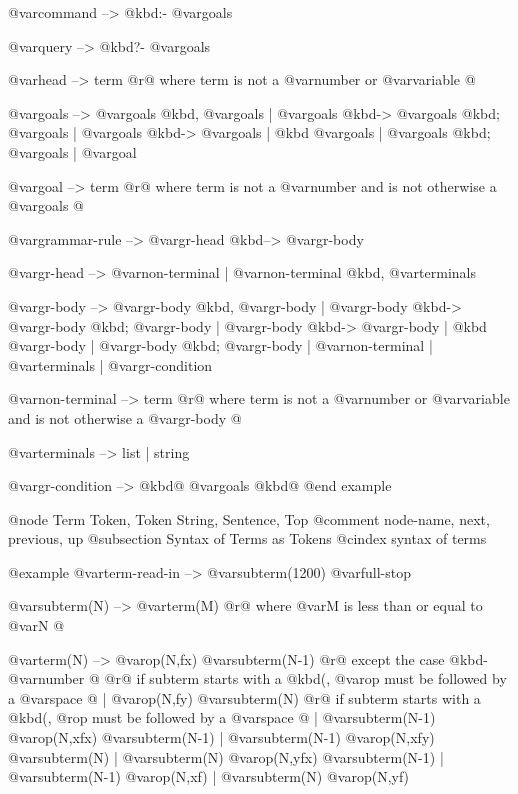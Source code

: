 {{@var{command}           --> @kbd{:-} @var{goals}

@var{query}             --> @kbd{?-} @var{goals}

@var{head}              --> term
                         @r{@{ where term is not a @var{number} or @var{variable} @}}

@var{goals}             --> @var{goals} @kbd{,} @var{goals}
                   |  @var{goals} @kbd{->} @var{goals} @kbd{;} @var{goals}
                   |  @var{goals} @kbd{->} @var{goals}
                   |  @kbd{\+} @var{goals}
                   |  @var{goals} @kbd{;} @var{goals}
                   |  @var{goal}

@var{goal}              --> term
                         @r{@{ where term is not a @var{number}
                           and is not otherwise a @var{goals} @}}

@var{grammar-rule}      --> @var{gr-head} @kbd{-->} @var{gr-body}

@var{gr-head}           --> @var{non-terminal}
                   |  @var{non-terminal} @kbd{,} @var{terminals}

@var{gr-body}           --> @var{gr-body} @kbd{,} @var{gr-body}
                   |  @var{gr-body} @kbd{->} @var{gr-body} @kbd{;} @var{gr-body}
                   |  @var{gr-body} @kbd{->} @var{gr-body}
                   |  @kbd{\+} @var{gr-body}
                   |  @var{gr-body} @kbd{;} @var{gr-body}
                   |  @var{non-terminal}
                   |  @var{terminals}
                   |  @var{gr-condition}

@var{non-terminal}      --> term
                         @r{@{ where term is not a @var{number} or @var{variable}
                           and is not otherwise a @var{gr-body} @}}

@var{terminals}         --> list | string

@var{gr-condition}      --> @kbd{@{} @var{goals} @kbd{@}}
@end example

@node Term Token, Token String, Sentence, Top
@comment  node-name,  next,  previous,  up
@subsection Syntax of Terms as Tokens
@cindex syntax of terms

@example
@var{term-read-in}      --> @var{subterm(1200)} @var{full-stop}

@var{subterm(N)}        --> @var{term(M)}
                         @r{@{ where @var{M} is less than or equal to @var{N} @}}

@var{term(N)}           --> @var{op(N,fx)} @var{subterm(N-1)}
                         @r{@{ except the case @kbd{-} @var{number} @}}
                         @r{@{ if subterm starts with a @kbd{(},
                           @var{op} must be followed by a @var{space} @}}
                   |  @var{op(N,fy)} @var{subterm(N)}
                         @r{@{ if subterm starts with a @kbd{(},}
                           @r{op must be followed by a @var{space} @}}
                   |  @var{subterm(N-1)} @var{op(N,xfx)} @var{subterm(N-1)}
                   |  @var{subterm(N-1)} @var{op(N,xfy)} @var{subterm(N)}
                   |  @var{subterm(N)} @var{op(N,yfx)} @var{subterm(N-1)}
                   |  @var{subterm(N-1)} @var{op(N,xf)}
                   |  @var{subterm(N)} @var{op(N,yf)}

}}

